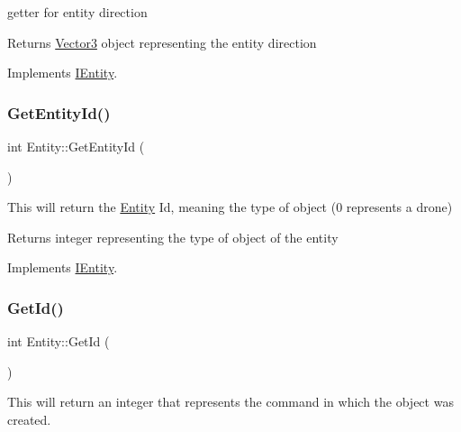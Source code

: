 getter for entity direction 

\begin{DoxyReturn}{Returns}
\hyperlink{classVector3}{Vector3} object representing the entity direction 
\end{DoxyReturn}


Implements \hyperlink{classIEntity_aa99a8fef8b22195a5113c38ef51f086d}{I\+Entity}.

\mbox{\label{classEntity_afd77b9faebc188849705d91c239d193c}} 
\subsubsection{\texorpdfstring{Get\+Entity\+Id()}{GetEntityId()}}
{\footnotesize\ttfamily int Entity\+::\+Get\+Entity\+Id (\begin{DoxyParamCaption}{ }\end{DoxyParamCaption})\hspace{0.3cm}{\ttfamily [virtual]}}



This will return the \hyperlink{classEntity}{Entity} Id, meaning the type of object (0 represents a drone) 

\begin{DoxyReturn}{Returns}
integer representing the type of object of the entity 
\end{DoxyReturn}


Implements \hyperlink{classIEntity_a4359ee47413fa0b2940b3b0336e13861}{I\+Entity}.

\mbox{\label{classEntity_a0040a9ca2da893a4eccec20f542220a9}} 
\subsubsection{\texorpdfstring{Get\+Id()}{GetId()}}
{\footnotesize\ttfamily int Entity\+::\+Get\+Id (\begin{DoxyParamCaption}{ }\end{DoxyParamCaption})\hspace{0.3cm}{\ttfamily [virtual]}}



This will return an integer that represents the command in which the object was created. 

